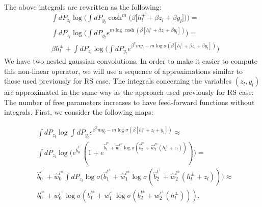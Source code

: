 \documentclass[aps,physrev,10pt,floatfix,longbibliography,nofootinbib,reprint]{revtex4-2}
\begin{document}
The above integrals are rewritten as the following:
\begin{align}
& \int dP_{z_l} \log \bigg( \int dP_{y_{l}}  \cosh^m\bigg(\beta \big[h_l^{\pm}+\beta z_l + \beta  y_{l}\big]  \bigg)  \bigg) 
 = \\
& \int dP_{z_l} \log \biggl( \int dP_{y_{l}} e^{ m \log \cosh \left(\beta \left[h_l^{\pm}+ \beta  z_l + \beta  y_{l}\right]  \right) } \biggr) 
 = \\
& \beta h_{l}^{\pm} + \int dP_{z_l} \log \biggl( \int dP_{y_{l}} e^{\beta^2 m y_{l} - m \log \sigma \left(\beta \left[h_l^{\pm}+ \beta z_l +\beta y_{l}\right]  \right) } \biggr) 
\end{align}
We have two nested gaussian convolutions. In order to make it easier to compute this non-linear operator, we will use a sequence of approximations similar to those used previously for RS case. %
The integrals concerning the variables $(z_l, y_l)$ are approximated in the same way as the approach used previously for RS case: The number of free parameters increases to have feed-forward functions without integrals. First, we consider the following maps:
\begin{widetext}
\begin{align}
        & \int dP_{z_l}  \log \int dP_{y_{l}} e^{ \beta^2 m y_{l} - m \log \sigma \left(\beta \left[h_l^{\pm}+ z_l + y_{l}\right]  \right) }  \approx\\
        & \int dP_{z_l} \log \bigg( e^{\hat{b}_0^{l^{\pm}}}(1 + e^{\hat{b}_1^{l^{\pm}} + \hat{w}_1^{l^{\pm}} \log \sigma (\hat{b}_2^{l^{\pm}} + \hat{w}_2^{l^{\pm}} (h_l^{\pm}+ z_l)) }) \bigg) = \\
        & \hat{b}_0^{l^{\pm}} + \hat{w}_0^{l^{\pm}} \int dP_{z_l} \log \sigma \bigg(\hat{b}_1^{l^{\pm}} + \hat{w}_1^{l^{\pm}} \log \sigma (\hat{b}_2^{l^{\pm}} + \hat{w}_2^{l^{\pm}} (h_l^{\pm}+ z_l)) \bigg) \approx \\
        & b_0^{l^{\pm}} + w_0^{l^{\pm}} \log \sigma (b_1^{l^{\pm}} + w_1^{l^{\pm}} \log \sigma (b_2^{l^{\pm}} + w_2^{l^{\pm}} (h_l^{\pm}))),
\end{align}
\end{widetext}
\end{document}
